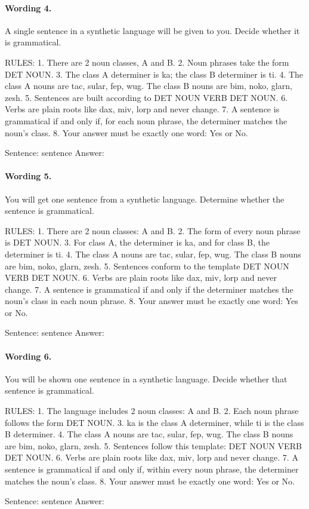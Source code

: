 \paragraph{Wording 4.}
\begin{promptbox}
A single sentence in a synthetic language will be given to you. Decide whether it is grammatical.

RULES:
1. There are 2 noun classes, A and B.
2. Noun phrases take the form DET NOUN.
3. The class A determiner is ka; the class B determiner is ti.
4. The class A nouns are tac, sular, fep, wug. The class B nouns are bim, noko, glarn, zesh.
5. Sentences are built according to DET NOUN VERB DET NOUN.
6. Verbs are plain roots like dax, miv, lorp and never change.
7. A sentence is grammatical if and only if, for each noun phrase, the determiner matches the noun's class.
8. Your answer must be exactly one word: Yes or No.

Sentence: {sentence}
Answer:
\end{promptbox}

\paragraph{Wording 5.}
\begin{promptbox}
You will get one sentence from a synthetic language. Determine whether the sentence is grammatical.

RULES:
1. There are 2 noun classes: A and B.
2. The form of every noun phrase is DET NOUN.
3. For class A, the determiner is ka, and for class B, the determiner is ti.
4. The class A nouns are tac, sular, fep, wug. The class B nouns are bim, noko, glarn, zesh.
5. Sentences conform to the template DET NOUN VERB DET NOUN.
6. Verbs are plain roots like dax, miv, lorp and never change.
7. A sentence is grammatical if and only if the determiner matches the noun's class in each noun phrase.
8. Your answer must be exactly one word: Yes or No.

Sentence: {sentence}
Answer:
\end{promptbox}

\paragraph{Wording 6.}
\begin{promptbox}
You will be shown one sentence in a synthetic language. Decide whether that sentence is grammatical.

RULES:
1. The language includes 2 noun classes: A and B.
2. Each noun phrase follows the form DET NOUN.
3. ka is the class A determiner, while ti is the class B determiner.
4. The class A nouns are tac, sular, fep, wug. The class B nouns are bim, noko, glarn, zesh.
5. Sentences follow this template: DET NOUN VERB DET NOUN.
6. Verbs are plain roots like dax, miv, lorp and never change.
7. A sentence is grammatical if and only if, within every noun phrase, the determiner matches the noun's class.
8. Your answer must be exactly one word: Yes or No.

Sentence: {sentence}
Answer:
\end{promptbox}

